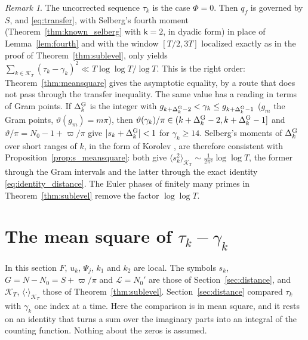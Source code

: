 \documentclass[11pt,a4paper]{article}
\makeatletter
\numberwithin{equation}{section}
\DeclareRobustCommand{\CGref}[1]{\ref{#1}}
\DeclareRobustCommand{\CGeqref}[1]{\eqref{#1}}
\DeclareRobustCommand{\CGcite}[2][]{\if\relax\detokenize{#1}\relax\cite{#2}\else\cite[#1]{#2}\fi}
\let\CG@origref\ref
\let\CG@origeqref\eqref
\newcommand{\CG@gettip}[1]{\@ifundefined{CGTip@#1}{#1}{\csname CGTip@#1\endcsname}}
\newcommand{\CG@getbib}[1]{\@ifundefined{CGBib@#1}{#1}{\csname CGBib@#1\endcsname}}
\DeclareRobustCommand{\CGref}[1]{\pdftooltip{\CG@origref{#1}}{\CG@gettip{#1}}}
\DeclareRobustCommand{\CGeqref}[1]{\pdftooltip{\CG@origeqref{#1}}{\CG@gettip{#1}}}
\DeclareRobustCommand{\CGcite}[2][]{\pdftooltip{\if\relax\detokenize{#1}\relax\cite{#2}\else\cite[#1]{#2}\fi}{\CG@getbib{#2}}}
\theoremstyle{definition}
\theoremstyle{remark}
\newtheorem{remark}[theorem]{Remark}
\newcommand{\Nz}{N_0} %
\newcommand{\lL}{\mathcal L}
\newcommand{\Ph}{\Phi}
\newcommand{\Kc}{\mathcal K}
\makeatother
\begin{document}
\begin{remark}\label{rem:bare_point}
The uncorrected sequence $\tau_k$ is the case $\Ph=0$. Then $q_f$ is governed by $S$, and \CGeqref{eq:transfer}, with Selberg's fourth moment (Theorem~\CGref{thm:known_selberg} with $\mathsf k=2$, in dyadic form) in place of Lemma~\CGref{lem:fourth} and with the window $[T/2,3T]$ localized exactly as in the proof of Theorem~\CGref{thm:sublevel}, only yields $\sum_{k\in\Kc_T}(\tau_k-\gamma_k)^2\ll T\log\log T/\log T$. This is the right order: Theorem~\CGref{thm:meansquare} gives the asymptotic equality, by a route that does not pass through the transfer inequality. The same value has a reading in terms of Gram points. If $\Delta^{\rm G}_k$ is the integer with $g_{k+\Delta^{\rm G}_k-2}<\gamma_k\le g_{k+\Delta^{\rm G}_k-1}$ ($g_m$ the Gram points, $\vartheta(g_m)=m\pi$), then $\vartheta(\gamma_k)/\pi\in(k+\Delta^{\rm G}_k-2,k+\Delta^{\rm G}_k-1]$ and $\vartheta/\pi=\Nz-1+\varpi/\pi$ give $|s_k+\Delta^{\rm G}_k|<1$ for $\gamma_k\ge14$. Selberg's moments of $\Delta^{\rm G}_k$ over short ranges of $k$, in the form of Korolev \CGcite[Thm.~4.2]{Korolev2012}, are therefore consistent with Proposition~\CGref{prop:s_meansquare}: both give $\langle s_k^2\rangle_{\Kc_T}\sim\frac1{2\pi^2}\log\log T$, the former through the Gram intervals and the latter through the exact identity \CGeqref{eq:identity_distance}. The Euler phases of finitely many primes in Theorem~\CGref{thm:sublevel} remove the factor $\log\log T$.
\end{remark}

\section{The mean square of \texorpdfstring{$\tau_k-\gamma_k$}{tau\_k - gamma\_k}}\label{sec:meansquare}

In this section $F$, $u_k$, $\Psi_j$, $k_1$ and $k_2$ are local. The symbols $s_k$, $G=N-\Nz=S+\varpi/\pi$ and $\lL=\Nz'$ are those of Section~\CGref{sec:distance}, and $\Kc_T$, $\langle\cdot\rangle_{\Kc_T}$ those of Theorem~\CGref{thm:sublevel}. Section~\CGref{sec:distance} compared $\tau_k$ with $\gamma_k$ one index at a time. Here the comparison is in mean square, and it rests on an identity that turns a sum over the imaginary parts into an integral of the counting function. Nothing about the zeros is assumed.
\end{document}
